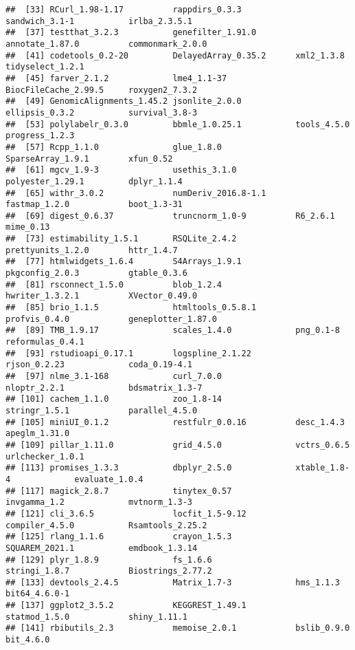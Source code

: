 \documentclass[
]{article}
\begin{document}
\begin{verbatim}
##  [33] RCurl_1.98-1.17          rappdirs_0.3.3           sandwich_3.1-1           irlba_2.3.5.1           
##  [37] testthat_3.2.3           genefilter_1.91.0        annotate_1.87.0          commonmark_2.0.0        
##  [41] codetools_0.2-20         DelayedArray_0.35.2      xml2_1.3.8               tidyselect_1.2.1        
##  [45] farver_2.1.2             lme4_1.1-37              BiocFileCache_2.99.5     roxygen2_7.3.2          
##  [49] GenomicAlignments_1.45.2 jsonlite_2.0.0           ellipsis_0.3.2           survival_3.8-3          
##  [53] polylabelr_0.3.0         bbmle_1.0.25.1           tools_4.5.0              progress_1.2.3          
##  [57] Rcpp_1.1.0               glue_1.8.0               SparseArray_1.9.1        xfun_0.52               
##  [61] mgcv_1.9-3               usethis_3.1.0            polyester_1.29.1         dplyr_1.1.4             
##  [65] withr_3.0.2              numDeriv_2016.8-1.1      fastmap_1.2.0            boot_1.3-31             
##  [69] digest_0.6.37            truncnorm_1.0-9          R6_2.6.1                 mime_0.13               
##  [73] estimability_1.5.1       RSQLite_2.4.2            prettyunits_1.2.0        httr_1.4.7              
##  [77] htmlwidgets_1.6.4        S4Arrays_1.9.1           pkgconfig_2.0.3          gtable_0.3.6            
##  [81] rsconnect_1.5.0          blob_1.2.4               hwriter_1.3.2.1          XVector_0.49.0          
##  [85] brio_1.1.5               htmltools_0.5.8.1        profvis_0.4.0            geneplotter_1.87.0      
##  [89] TMB_1.9.17               scales_1.4.0             png_0.1-8                reformulas_0.4.1        
##  [93] rstudioapi_0.17.1        logspline_2.1.22         rjson_0.2.23             coda_0.19-4.1           
##  [97] nlme_3.1-168             curl_7.0.0               nloptr_2.2.1             bdsmatrix_1.3-7         
## [101] cachem_1.1.0             zoo_1.8-14               stringr_1.5.1            parallel_4.5.0          
## [105] miniUI_0.1.2             restfulr_0.0.16          desc_1.4.3               apeglm_1.31.0           
## [109] pillar_1.11.0            grid_4.5.0               vctrs_0.6.5              urlchecker_1.0.1        
## [113] promises_1.3.3           dbplyr_2.5.0             xtable_1.8-4             evaluate_1.0.4          
## [117] magick_2.8.7             tinytex_0.57             invgamma_1.2             mvtnorm_1.3-3           
## [121] cli_3.6.5                locfit_1.5-9.12          compiler_4.5.0           Rsamtools_2.25.2        
## [125] rlang_1.1.6              crayon_1.5.3             SQUAREM_2021.1           emdbook_1.3.14          
## [129] plyr_1.8.9               fs_1.6.6                 stringi_1.8.7            Biostrings_2.77.2       
## [133] devtools_2.4.5           Matrix_1.7-3             hms_1.1.3                bit64_4.6.0-1           
## [137] ggplot2_3.5.2            KEGGREST_1.49.1          statmod_1.5.0            shiny_1.11.1            
## [141] rbibutils_2.3            memoise_2.0.1            bslib_0.9.0              bit_4.6.0
\end{verbatim}
\end{document}
